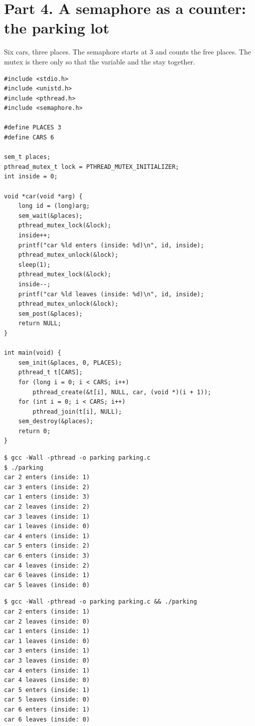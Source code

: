 \documentclass[11pt,a4paper]{article}
\begin{document}
\section{Part 4. A semaphore as a counter: the parking lot}

Six cars, three places. The semaphore starts at 3 and counts the free places. The mutex is there
only so that the variable  and the  stay together.

\begin{lstlisting}[style=ccode,caption={parking.c}]
#include <stdio.h>
#include <unistd.h>
#include <pthread.h>
#include <semaphore.h>

#define PLACES 3
#define CARS 6

sem_t places;
pthread_mutex_t lock = PTHREAD_MUTEX_INITIALIZER;
int inside = 0;

void *car(void *arg) {
    long id = (long)arg;
    sem_wait(&places);
    pthread_mutex_lock(&lock);
    inside++;
    printf("car %ld enters (inside: %d)\n", id, inside);
    pthread_mutex_unlock(&lock);
    sleep(1);
    pthread_mutex_lock(&lock);
    inside--;
    printf("car %ld leaves (inside: %d)\n", id, inside);
    pthread_mutex_unlock(&lock);
    sem_post(&places);
    return NULL;
}

int main(void) {
    sem_init(&places, 0, PLACES);
    pthread_t t[CARS];
    for (long i = 0; i < CARS; i++)
        pthread_create(&t[i], NULL, car, (void *)(i + 1));
    for (int i = 0; i < CARS; i++)
        pthread_join(t[i], NULL);
    sem_destroy(&places);
    return 0;
}
\end{lstlisting}

\begin{lstlisting}[caption={parking with 3 places}]
$ gcc -Wall -pthread -o parking parking.c
$ ./parking
car 2 enters (inside: 1)
car 3 enters (inside: 2)
car 1 enters (inside: 3)
car 2 leaves (inside: 2)
car 3 leaves (inside: 1)
car 1 leaves (inside: 0)
car 4 enters (inside: 1)
car 5 enters (inside: 2)
car 6 enters (inside: 3)
car 4 leaves (inside: 2)
car 6 leaves (inside: 1)
car 5 leaves (inside: 0)
\end{lstlisting}

\begin{lstlisting}[caption={parking with PLACES set to 1}]
$ gcc -Wall -pthread -o parking parking.c && ./parking
car 2 enters (inside: 1)
car 2 leaves (inside: 0)
car 1 enters (inside: 1)
car 1 leaves (inside: 0)
car 3 enters (inside: 1)
car 3 leaves (inside: 0)
car 4 enters (inside: 1)
car 4 leaves (inside: 0)
car 5 enters (inside: 1)
car 5 leaves (inside: 0)
car 6 enters (inside: 1)
car 6 leaves (inside: 0)
\end{lstlisting}
\end{document}
